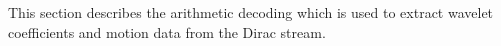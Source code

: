 This section describes the arithmetic decoding which is
used to extract wavelet coefficients and motion data from the
Dirac stream.

